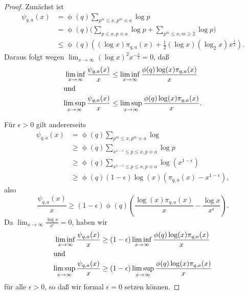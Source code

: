\documentclass[a4paper,twoside,openright]{report}
\theoremstyle{definition}
\theoremstyle{remark}
\DeclareMathOperator{\totient}{\phi}
\begin{document}
\begin{proof}
  Zunächst ist
  \[
    \begin{split}
      \psi_{q, a}(x) & = \totient(q) \sum_{p^m \leq x, p^m \equiv a} \log p
      \\
      & = \totient(q) \Biggl( \sum_{p \leq x, p \equiv a} \log p
      + \sum_{p^m \leq x, m \geq 2} \log p \Biggr)
      \\
      & \leq \totient(q) \left((\log x) \pi_{q, a}(x) + \frac 1 2 (\log x) (\log_2 x) x^{\frac 1 2}\right).
    \end{split}
  \]
  Daraus folgt wegen $\lim_{x \to \infty} (\log x)^2 x^{-\frac 1 2} = 0$, daß
  \begin{align*}
    \liminf_{x \to \infty} \frac{\psi_{q, a}(x)} x & \leq \liminf_{x \to \infty} \frac{\totient(q) \log(x) \pi_{q, a}(x)} x \\
    \intertext{und}
    \limsup_{x \to \infty} \frac{\psi_{q, a}(x)} x & \leq \limsup_{x \to \infty} \frac{\totient(q) \log(x) \pi_{q, a}(x)} x.
  \end{align*}
  
  Für $\epsilon > 0$ gilt andererseits
  \[
    \begin{split}
      \psi_{q, a}(x)
      & = \totient(q) \sum_{p^m \leq x, p^m \equiv a} \log
      \\
      & \ge \totient(q) \sum_{x^{1 - \epsilon} \leq p \leq x, p \equiv a} \log p
      \\
      & \ge \totient(q) \sum_{x^{1 - \epsilon} \leq p \leq x, p \equiv a} \log(x^{1 - \epsilon})
      \\
      & \ge \totient(q) (1 - \epsilon) \log (x) (\pi_{q, a}(x) - x^{1 - \epsilon}),
    \end{split}
  \]
  also
  \[
    \frac{\psi_{q, a}(x)} x \ge (1 - \epsilon) \totient(q) \left(\frac{\log(x) \pi_{q, a}(x)} x - \frac{\log x}{x^{\epsilon}}\right).
  \]
  Da $\lim_{x \to \infty} \frac{\log x}{x^\epsilon} = 0$, haben wir
  \begin{align*}
    \liminf_{x \to \infty} \frac{\psi_{q, a}(x)} x & \geq (1 - \epsilon) \liminf_{x \to \infty} \frac{\totient(q) \log(x) \pi_{q, a}(x)} x \\
    \intertext{und}
    \limsup_{x \to \infty} \frac{\psi_{q, a}(x)} x & \geq (1 - \epsilon) \limsup_{x \to \infty} \frac{\totient(q) \log(x) \pi_{q, a}(x)} x
  \end{align*}
  für alle $\epsilon > 0$, so daß wir formal $\epsilon = 0$ setzen können.
\end{proof}
\end{document}
